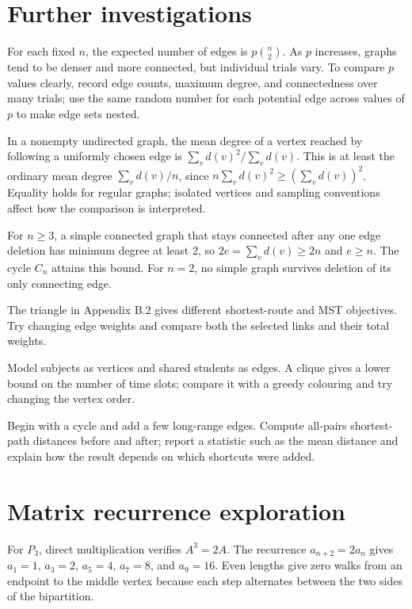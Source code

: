 \section*{Further investigations}
\begin{description}[style=nextline]
\item[Random graphs] For each fixed $n$, the expected number of edges is $p\binom n2$. As $p$ increases, graphs tend to be denser and more connected, but individual trials vary. To compare $p$ values clearly, record edge counts, maximum degree, and connectedness over many trials; use the same random number for each potential edge across values of $p$ to make edge sets nested.
\item[Friendship paradox] In a nonempty undirected graph, the mean degree of a vertex reached by following a uniformly chosen edge is $\sum_v d(v)^2/\sum_v d(v)$. This is at least the ordinary mean degree $\sum_v d(v)/n$, since $n\sum_vd(v)^2\geq(\sum_vd(v))^2$. Equality holds for regular graphs; isolated vertices and sampling conventions affect how the comparison is interpreted.
\item[Resilient connections] For $n\geq3$, a simple connected graph that stays connected after any one edge deletion has minimum degree at least 2, so $2e=\sum_vd(v)\geq2n$ and $e\geq n$. The cycle $C_n$ attains this bound. For $n=2$, no simple graph survives deletion of its only connecting edge.
\item[Route planning] The triangle in Appendix B.2 gives different shortest-route and MST objectives. Try changing edge weights and compare both the selected links and their total weights.
\item[Timetable design] Model subjects as vertices and shared students as edges. A clique gives a lower bound on the number of time slots; compare it with a greedy colouring and try changing the vertex order.
\item[Small-world networks] Begin with a cycle and add a few long-range edges. Compute all-pairs shortest-path distances before and after; report a statistic such as the mean distance and explain how the result depends on which shortcuts were added.
\end{description}

\section*{Matrix recurrence exploration}
For $P_3$, direct multiplication verifies $A^3=2A$. The recurrence $a_{n+2}=2a_n$ gives $a_1=1$, $a_3=2$, $a_5=4$, $a_7=8$, and $a_9=16$. Even lengths give zero walks from an endpoint to the middle vertex because each step alternates between the two sides of the bipartition.


